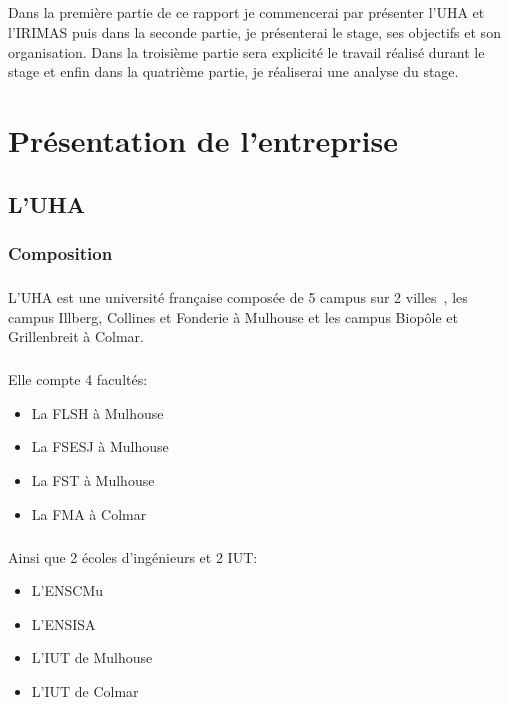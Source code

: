 \documentclass[a4paper,11pt,twoside,french,report]{../common/simplem}
\begin{document}
		\paragraph*{}
			Dans la première partie de ce rapport je commencerai par présenter l'\gls{UHA} et l'\gls{IRIMAS} puis dans la seconde partie, je présenterai le stage, ses objectifs et son organisation. Dans la troisième partie sera explicité le travail réalisé durant le stage et enfin dans la quatrième partie, je réaliserai une analyse du stage.
	\chapter{Présentation de l'entreprise}
		\section{L'\acrshort{UHA}}
			\subsection{Composition}
				\paragraph*{}
					L'\gls{UHA} est une université française composée de 5 campus sur 2 villes~\cite{UHA_Organisation}, les campus Illberg, Collines et Fonderie à Mulhouse et les campus Biopôle et Grillenbreit à Colmar.
				\paragraph*{}
					Elle compte 4 facultés:
					\begin{itemize}
						\item La \gls{FLSH} à Mulhouse
						\item La \gls{FSESJ} à Mulhouse
						\item La \gls{FST} à Mulhouse
						\item La \gls{FMA} à Colmar
					\end{itemize}
				\paragraph*{}
					Ainsi que 2 écoles d'ingénieurs et 2 \gls{IUT}:
					\begin{itemize}
						\item L'\gls{ENSCMu}
						\item L'\gls{ENSISA}
						\item L'\gls{IUT} de Mulhouse
						\item L'\gls{IUT} de Colmar
					\end{itemize}
\end{document}

